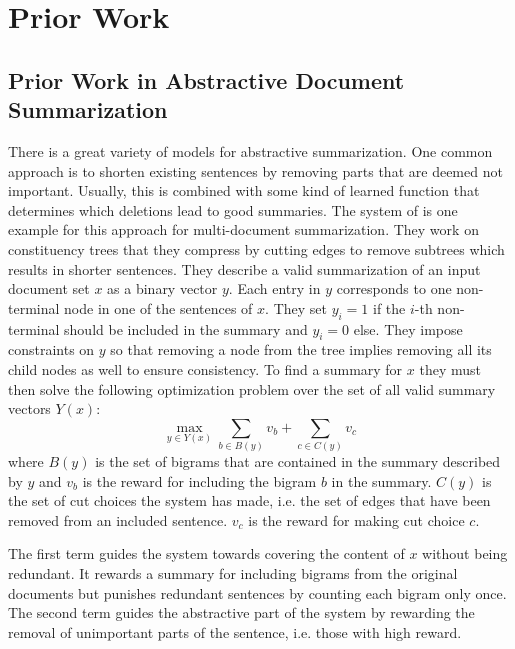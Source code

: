 \documentclass[a4paper,BCOR=10mm]{report}
\numberwithin{lemma}{chapter}
\numberwithin{definition}{chapter}
\begin{document}
\chapter{Prior Work} \label{sec:prior-work} 

\section{Prior Work in Abstractive Document Summarization} \label{sec:prior-work-mds} 

There is a great variety of models for abstractive summarization. One common approach is to shorten existing sentences by removing parts that are deemed not important. Usually, this is combined with some kind of learned function that determines which deletions lead to good summaries.
The system of \citet{berg-kirkpatrick} is one example for this approach for multi-document summarization. They work on constituency trees that they compress by cutting edges to remove subtrees which results in shorter sentences.
They describe a valid summarization of an input document set $x$ as a binary vector $y$. Each entry in $y$ corresponds to one non-terminal node in one of the sentences of $x$. They set $y_i = 1$ if the $i$-th non-terminal should be included in the summary and $y_i = 0$ else. They impose constraints on $y$ so that removing a node from the tree implies removing all its child nodes as well to ensure consistency.
To find a summary for $x$ they must then solve the following optimization problem over the set of all valid summary vectors $Y(x)$:
\begin{equation}
\max_{y \in Y(x)} \sum_{b \in B(y)} v_b + \sum_{c \in C(y)} v_c
\end{equation}
where $B(y)$ is the set of bigrams that are contained in the summary described by $y$ and $v_b$ is the reward for including the bigram $b$ in the summary. $C(y)$ is the set of cut choices the system has made, i.e. the set of edges that have been removed from an included sentence. $v_c$ is the reward for making cut choice $c$.

The first term guides the system towards covering the content of $x$ without being redundant. It rewards a summary for including bigrams from the original documents but punishes redundant sentences by counting each bigram only once.
The second term guides the abstractive part of the system by rewarding the removal of unimportant parts of the sentence, i.e. those with high reward.

\end{document}
